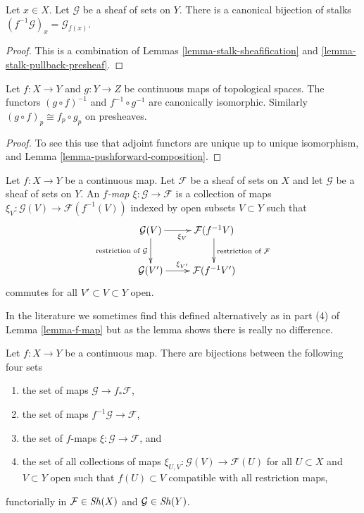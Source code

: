 \begin{lemma}
\label{lemma-stalk-pullback}
Let $x \in X$. Let $\mathcal{G}$ be a sheaf of sets on $Y$.
There is a canonical bijection of stalks
$(f^{-1}\mathcal{G})_x = \mathcal{G}_{f(x)}$.
\end{lemma}

\begin{proof}
This is a combination of Lemmas \ref{lemma-stalk-sheafification}
and \ref{lemma-stalk-pullback-presheaf}.
\end{proof}

\begin{lemma}
\label{lemma-pullback-composition}
Let $f : X \to Y$ and $g : Y \to Z$ be continuous maps
of topological spaces. The functors $(g \circ f)^{-1}$
and $f^{-1} \circ g^{-1}$ are canonically isomorphic.
Similarly $(g \circ f)_p \cong f_p \circ g_p$ on
presheaves.
\end{lemma}

\begin{proof}
To see this
use that adjoint functors are unique up to unique isomorphism,
and Lemma \ref{lemma-pushforward-composition}.
\end{proof}

\begin{definition}
\label{definition-f-map}
Let $f : X \to Y$ be a continuous map.
Let $\mathcal{F}$ be a sheaf of sets on $X$ and
let $\mathcal{G}$ be a sheaf of sets on $Y$.
An {\it $f$-map $\xi : \mathcal{G} \to \mathcal{F}$}
is a collection of maps
$\xi_V : \mathcal{G}(V) \to \mathcal{F}(f^{-1}(V))$
indexed by open subsets $V \subset Y$ such that
$$
\xymatrix{
\mathcal{G}(V) \ar[r]_{\xi_V} \ar[d]_{\text{restriction of }\mathcal{G}} &
\mathcal{F}(f^{-1}V) \ar[d]^{\text{restriction of }\mathcal{F}} \\
\mathcal{G}(V') \ar[r]^{\xi_{V'}} &
\mathcal{F}(f^{-1}V')
}
$$
commutes for all $V' \subset V \subset Y$ open.
\end{definition}

\noindent
In the literature we sometimes find this defined alternatively
as in part (4) of Lemma \ref{lemma-f-map} but as the lemma shows there
is really no difference.

\begin{lemma}
\label{lemma-f-map}
Let $f : X \to Y$ be a continuous map.
There are bijections between the following four sets
\begin{enumerate}
\item the set of maps $\mathcal{G} \to f_*\mathcal{F}$,
\item the set of maps $f^{-1}\mathcal{G} \to \mathcal{F}$,
\item the set of $f$-maps $\xi : \mathcal{G} \to \mathcal{F}$, and
\item the set of all collections of maps
$\xi_{U, V} : \mathcal{G}(V) \to \mathcal{F}(U)$ for all
$U \subset X$ and $V \subset Y$ open such that $f(U) \subset V$
compatible with all restriction maps,
\end{enumerate}
functorially in $\mathcal{F} \in \mathop{\mathit{Sh}}\nolimits(X)$ and $\mathcal{G} \in \mathop{\mathit{Sh}}\nolimits(Y)$.
\end{lemma}

